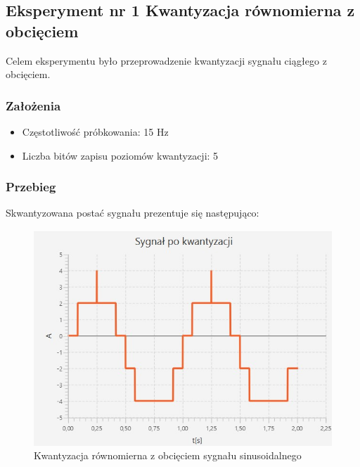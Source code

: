 \documentclass[12pt]{article}
\begin{document}
\subsection{Eksperyment nr 1 Kwantyzacja równomierna z obcięciem}

Celem eksperymentu było przeprowadzenie kwantyzacji sygnału ciągłego z obcięciem.

\subsubsection{Założenia}

\begin{itemize}
    \item Częstotliwość próbkowania: 15 Hz
    \item Liczba bitów zapisu poziomów kwantyzacji: 5
\end{itemize}
\subsubsection{Przebieg}
Skwantyzowana postać sygnału prezentuje się następująco:
\begin{figure}[H]
    \centering
	\includegraphics[width=\linewidth]{kwantyzacja_z_obcieciem.jpg}
    \caption{Kwantyzacja równomierna z obcięciem sygnału sinusoidalnego}
    \label{wykres dla eksperymentu 1.1}
\end{figure}
\end{document}
